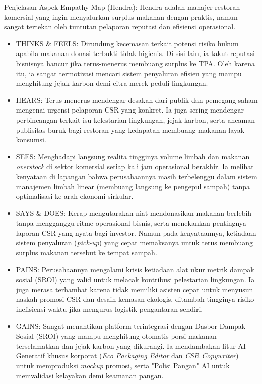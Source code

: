 Penjelasan Aspek Empathy Map (Hendra):
Hendra adalah manajer restoran komersial yang ingin menyalurkan surplus makanan dengan praktis, namun sangat tertekan oleh tuntutan pelaporan reputasi dan efisiensi operasional.
\begin{itemize}
    \item THINKS \& FEELS: Dirundung kecemasan terkait potensi risiko hukum apabila makanan donasi terbukti tidak higienis. Di sisi lain, ia takut reputasi bisnisnya hancur jika terus-menerus membuang surplus ke TPA. Oleh karena itu, ia sangat termotivasi mencari sistem penyaluran efisien yang mampu menghitung jejak karbon demi citra merek peduli lingkungan.
    \item HEARS: Terus-menerus mendengar desakan dari publik dan pemegang saham mengenai urgensi pelaporan CSR yang konkret. Ia juga sering mendengar perbincangan terkait isu kelestarian lingkungan, jejak karbon, serta ancaman publisitas buruk bagi restoran yang kedapatan membuang makanan layak konsumsi.
    \item SEES: Menghadapi langsung realita tingginya volume limbah dan makanan \textit{overstock} di sektor komersial setiap kali jam operasional berakhir. Ia melihat kenyataan di lapangan bahwa perusahaannya masih terbelenggu dalam sistem manajemen limbah linear (membuang langsung ke pengepul sampah) tanpa optimalisasi ke arah ekonomi sirkular.
    \item SAYS \& DOES: Kerap mengutarakan niat mendonasikan makanan berlebih tanpa mengganggu ritme operasional bisnis, serta menekankan pentingnya laporan CSR yang nyata bagi investor. Namun pada kenyataannya, ketiadaan sistem penyaluran (\textit{pick-up}) yang cepat memaksanya untuk terus membuang surplus makanan tersebut ke tempat sampah.
    \item PAINS: Perusahaannya mengalami krisis ketiadaan alat ukur metrik dampak sosial (SROI) yang valid untuk melacak kontribusi pelestarian lingkungan. Ia juga merasa terhambat karena tidak memiliki asisten cepat untuk menyusun naskah promosi CSR dan desain kemasan ekologis, ditambah tingginya risiko inefisiensi waktu jika mengurus logistik pengantaran sendiri.
    \item GAINS: Sangat menantikan platform terintegrasi dengan Dasbor Dampak Sosial (SROI) yang mampu menghitung otomatis porsi makanan terselamatkan dan jejak karbon yang dikurangi. Ia mendambakan fitur AI Generatif khusus korporat (\textit{Eco Packaging Editor} dan \textit{CSR Copywriter}) untuk memproduksi \textit{mockup} promosi, serta "Polisi Pangan" AI untuk memvalidasi kelayakan demi keamanan pangan.
\end{itemize}

